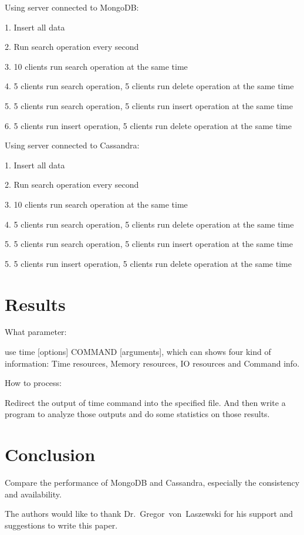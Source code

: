 Using server connected to MongoDB:

1. Insert all data

2. Run search operation every second

3. 10 clients run search operation at the same time

4. 5 clients run search operation, 5 clients run delete operation at the same time

5. 5 clients run search operation, 5 clients run insert operation at the same time

6. 5 clients run insert operation, 5 clients run delete operation at the same time


Using server connected to Cassandra:

1. Insert all data

2. Run search operation every second

3. 10 clients run search operation at the same time

4. 5 clients run search operation, 5 clients run delete operation at the same time

5. 5 clients run search operation, 5 clients run insert operation at the same time

5. 5 clients run insert operation, 5 clients run delete operation at the same time


\section{Results}
What parameter:

use time [options] COMMAND [arguments], which can shows four kind of information:
 Time resources, Memory resources, IO resources and Command info.

How to process:

Redirect the output of time command into the specified file. And then write a 
program to analyze those outputs and do some statistics on those results. 


\section{Conclusion}
Compare the performance of MongoDB and Cassandra, especially the consistency 
and availability.

\begin{acks}

  The authors would like to thank Dr.~Gregor~von~Laszewski for his
  support and suggestions to write this paper.

\end{acks}


 

